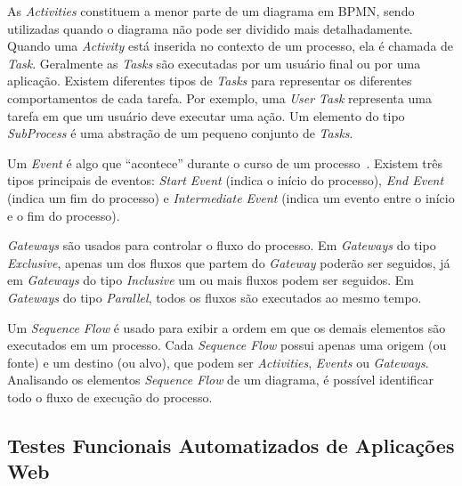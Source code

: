 \documentclass[12pt]{article}
\begin{document}
As \emph{Activities} constituem a menor parte de um diagrama em BPMN, sendo utilizadas quando o diagrama não pode ser dividido mais detalhadamente. Quando uma \emph{Activity} está inserida no contexto de um processo, ela é chamada de \emph{Task}. Geralmente as \emph{Tasks} são executadas por um usuário final ou por uma aplicação. Existem diferentes tipos de \emph{Tasks} para representar os diferentes comportamentos de cada tarefa. Por exemplo, uma \emph{User Task} representa uma tarefa em que um usuário deve executar uma ação. Um elemento do tipo \emph{SubProcess} é uma abstração de um pequeno conjunto de \emph{Tasks}.

Um \emph{Event} é algo que ``acontece'' durante o curso de um processo~\cite{model2011notation}. Existem três tipos principais de eventos: \emph{Start Event} (indica o início do processo), \emph{End Event} (indica um fim do processo) e \emph{Intermediate Event} (indica um evento entre o início e o fim do processo).

\emph{Gateways} são usados para controlar o fluxo do processo. Em \emph{Gateways} do tipo \emph{Exclusive}, apenas um dos fluxos que partem do \emph{Gateway} poderão ser seguidos, já em \emph{Gateways} do tipo \emph{Inclusive} um ou mais fluxos podem ser seguidos. Em \emph{Gateways} do tipo \emph{Parallel}, todos os fluxos são executados ao mesmo tempo.


Um \emph{Sequence Flow} é usado para exibir a ordem em que os demais elementos são executados em um processo. Cada \emph{Sequence Flow} possui apenas uma origem (ou fonte) e um destino (ou alvo), que podem ser \emph{Activities}, \emph{Events} ou \emph{Gateways}. Analisando os elementos \emph{Sequence Flow} de um diagrama, é possível identificar todo o fluxo de execução do processo.


\subsection{Testes Funcionais Automatizados de Aplicações Web}

\end{document}
